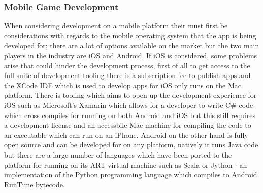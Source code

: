 \documentclass{article}
\begin{document}
	\subsubsection{Mobile Game Development}
	When considering development on a mobile platform their must first be considerations with regards to the mobile operating system that the app is being developed for; there are a lot of options available on the market but the two main players in the industry are iOS and Android. If iOS is considered, some problems arise that could hinder the development process, first of all to get access to the full suite of development tooling there is a subscription fee to publish apps and the XCode IDE which is used to develop  apps for iOS only runs on the Mac platform. There is tooling which aims to open up the development experience for iOS such as Microsoft's Xamarin\cite{Xamarin} which allows for a developer to write C\# code which cross compiles for running on both Android and iOS but this still requires a development license and an accessbile Mac machine for compiling the code to an executable which can run on an iPhone. Android on the other hand is fully open source and can be developed for on any platform, natively it runs Java code but there are a large number of languages which have been ported to the platform for running on its ART virtual machine such as Scala or Jython - an implementation of the Python programming language which compiles to Android RunTime bytecode.
\end{document}
